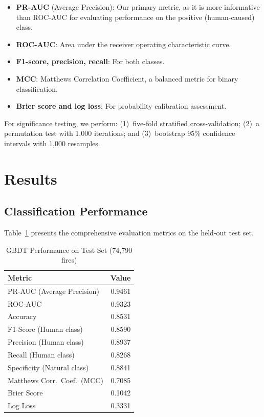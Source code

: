 \documentclass[sigconf,nonacm]{acmart}
\begin{document}
\begin{itemize}
    \item \textbf{PR-AUC} (Average Precision): Our primary metric, as it is more informative than ROC-AUC for evaluating performance on the positive (human-caused) class.
    \item \textbf{ROC-AUC}: Area under the receiver operating characteristic curve.
    \item \textbf{F1-score, precision, recall}: For both classes.
    \item \textbf{MCC}: Matthews Correlation Coefficient, a balanced metric for binary classification.
    \item \textbf{Brier score and log loss}: For probability calibration assessment.
\end{itemize}

For significance testing, we perform: (1)~five-fold stratified cross-validation; (2)~a permutation test with 1,000 iterations; and (3)~bootstrap 95\% confidence intervals with 1,000 resamples.

\section{Results}

\subsection{Classification Performance}

Table~\ref{tab:metrics} presents the comprehensive evaluation metrics on the held-out test set.

\begin{table}[t]
\caption{GBDT Performance on Test Set (74,790 fires)}
\label{tab:metrics}
\small
\centering
\begin{tabular}{lr}
\toprule
\textbf{Metric} & \textbf{Value} \\
\midrule
PR-AUC (Average Precision) & 0.9461 \\
ROC-AUC & 0.9323 \\
Accuracy & 0.8531 \\
F1-Score (Human class) & 0.8590 \\
Precision (Human class) & 0.8937 \\
Recall (Human class) & 0.8268 \\
Specificity (Natural class) & 0.8841 \\
Matthews Corr.\ Coef.\ (MCC) & 0.7085 \\
Brier Score & 0.1042 \\
Log Loss & 0.3331 \\
\bottomrule
\end{tabular}
\end{table}
\end{document}
